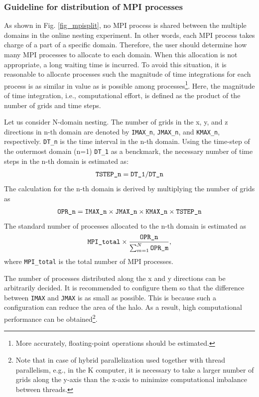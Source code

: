 \subsubsection{Guideline for distribution of MPI processes}

As shown in Fig. \ref{fig_mpisplit}, no MPI process is shared between the multiple domains in the online nesting experiment. In other words, each MPI process takes charge of a part of a specific domain. Therefore, the user should determine how many MPI processes to allocate to each domain. When this allocation is not appropriate, a long waiting time is incurred. To avoid this situation, it is reasonable to allocate processes such the magnitude of time integrations for each process is as similar in value as is possible among processes\footnote{More accurately, floating-point operations should be estimated.}. Here, the magnitude of time integration, i.e., computational effort, is defined as the product of the number of grids and time steps.

Let us consider N-domain nesting. The number of grids in the x, y, and z directions in n-th domain are denoted by
\verb|IMAX_n|, \verb|JMAX_n|, and \verb|KMAX_n|, respectively.
\verb|DT_n| is the time interval  in the n-th domain.
Using the time-step of the outermost domain (n=1) \verb|DT_1| as a benckmark, 
the necessary number of time steps in the n-th domain is estimated as:
\begin{eqnarray}
 \verb|TSTEP_n| = \verb|DT_1| / \verb|DT_n|  \nonumber
\end{eqnarray}
The calculation for the n-th domain is derived by multiplying the number of grids as
\begin{eqnarray}
 \verb|OPR_n| = \verb|IMAX_n| \times \verb|JMAX_n| \times \verb|KMAX_n| \times \verb|TSTEP_n| \nonumber
\end{eqnarray}
The standard number of processes allocated to the n-th domain is estimated as
\begin{eqnarray}
 \verb|MPI_total| \times \frac{ \texttt{OPR\_n} }{ \sum_{m=1}^N \texttt{OPR\_m} },
\end{eqnarray}
where \verb|MPI_total| is the total number of MPI processes.

The number of processes distributed along the x and y directions  can be arbitrarily decided.
It is recommended to configure them so that the difference between \verb|IMAX| and \verb|JMAX| is as small as possible. This is because such a configuration can reduce the area of the halo. As a result, high computational performance can be obtained\footnote{Note that in case of hybrid parallelization used together with thread parallelism,  e.g., in the K computer, it is necessary to take a larger number of grids along the y-axis than the x-axis to minimize computational imbalance between threads.}. 



